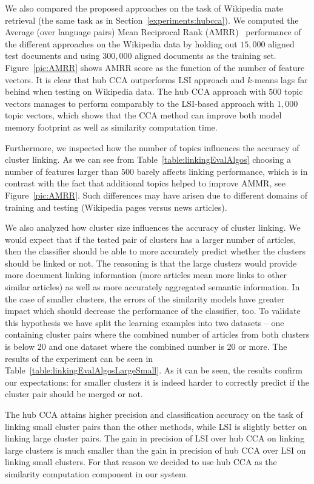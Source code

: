 We also compared the proposed approaches on the task of Wikipedia mate retrieval
(the same task as in Section~\ref{experiments:hubcca}). We computed the Average
(over language pairs) Mean Reciprocal Rank (AMRR)~\cite{voorhees1999trec}
performance of the different approaches on the  Wikipedia data by holding out $15,000$
aligned test documents and using $300,000$ aligned documents as the training set.
Figure~\ref{pic:AMRR} shows AMRR score as the function of the number of feature vectors.
It is clear that hub CCA outperforms LSI approach and $k$-means lags far behind when testing on Wikipedia data.
The hub CCA approach with $500$ topic vectors manages to perform comparably
to the LSI-based approach with $1,000$ topic vectors, which shows that the CCA
method can improve both model memory footprint as well as similarity computation time.

Furthermore, we inspected how the number of topics influences the accuracy of cluster linking.
As we can see from Table~\ref{table:linkingEvalAlgos} choosing a number of features larger
than $500$ barely affects linking performance, which is in contrast with the fact that additional
topics helped to improve AMMR, see Figure~\ref{pic:AMRR}. Such differences may have arisen
due to different domains of training and testing (Wikipedia pages versus news articles).

We also analyzed how cluster size influences the accuracy of cluster linking. We would
expect that if the tested pair of clusters has a larger number of articles, then the
classifier should be able to more accurately predict whether the clusters should be linked
or not. The reasoning is that the large clusters would provide more document linking information
(more articles mean more links to other similar articles) as well as more accurately aggregated
semantic information. In the case of smaller clusters, the errors of the similarity models have
greater impact which should decrease the performance of the classifier, too. To validate this
hypothesis we have split the learning examples into two datasets -- one containing cluster
pairs where the combined number of articles from both clusters is below 20 and one dataset
where the combined number is 20 or more. The results of the experiment can be seen in
Table~\ref{table:linkingEvalAlgosLargeSmall}. As it can be seen, the results confirm our
expectations: for smaller clusters it is indeed harder to correctly predict if the cluster
pair should be merged or not.

The hub CCA attains higher precision and classification accuracy on the task of linking
small cluster pairs than the other methods, while LSI is slightly better on linking large
cluster pairs. The gain in precision of LSI over hub CCA on linking large clusters is much
smaller than the gain in precision of hub CCA over LSI on linking small clusters. For that
reason we decided to use hub CCA as the similarity computation component in our system.

